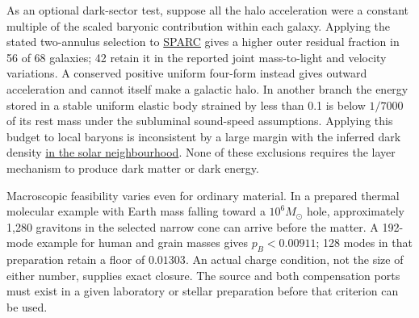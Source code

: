 As an optional dark-sector test, suppose all the halo acceleration were a constant multiple of the scaled baryonic contribution within each galaxy. Applying the stated two-annulus selection to \href{https://arxiv.org/abs/1606.09251}{SPARC} gives a higher outer residual fraction in 56 of 68 galaxies; 42 retain it in the reported joint mass-to-light and velocity variations. A conserved positive uniform four-form instead gives outward acceleration and cannot itself make a galactic halo. In another branch the energy stored in a stable uniform elastic body strained by less than 0.1 is below \(1/7000\) of its rest mass under the subluminal sound-speed assumptions. Applying this budget to local baryons is inconsistent by a large margin with the inferred dark density \href{https://arxiv.org/abs/1509.05334}{in the solar neighbourhood}. None of these exclusions requires the layer mechanism to produce dark matter or dark energy.

Macroscopic feasibility varies even for ordinary material. In a prepared thermal molecular example with Earth mass falling toward a \(10^6M_\odot\) hole, approximately 1,280 gravitons in the selected narrow cone can arrive before the matter. A 192-mode example for human and grain masses gives \(p_B<0.00911\); 128 modes in that preparation retain a floor of \(0.01303\). An actual charge condition, not the size of either number, supplies exact closure. The source and both compensation ports must exist in a given laboratory or stellar preparation before that criterion can be used.

